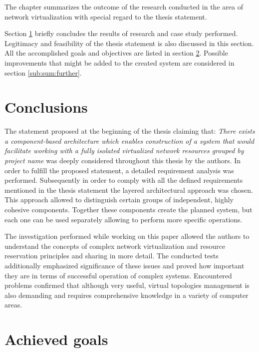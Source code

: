 \documentclass[11pt,openany]{book}
\begin{document}
    The chapter summarizes the outcome of the research conducted in the area of network virtualization with special
    regard to the thesis statement.
	
    Section \ref{sub:sum:concl} briefly concludes the results of research and case study performed. Legitimacy and
    feasibility of the thesis statement is also discussed in this section. All the accomplished goals and objectives are
    listed in section \ref{sub:sum:achieved}. Possible improvements that might be added to the created system are
    considered in section \ref{sub:sum:further}.


    \section{Conclusions}
    \label{sub:sum:concl}

      The statement proposed at the beginning of the thesis claiming that: \emph{There exists a component-based
      architecture which enables construction of a system that would facilitate working with a fully isolated
      virtualized network resources grouped by project name} was deeply considered throughout this thesis by the
      authors. In order to fulfill the proposed statement, a detailed requirement analysis was performed. Subsequently
      in order to comply with all the defined requirements mentioned in the thesis statement the layered architectural
      approach was chosen. This approach allowed to distinguish certain groups of independent, highly cohesive
      components. Together these components create the planned system, but each one can be used separately allowing to
      perform more specific operations.

      The investigation performed while working on this paper allowed the authors to understand the concepts of complex
      network virtualization and resource reservation principles and sharing in more detail. The conducted tests
      additionally emphasized significance of these issues and proved how important they are in terms of successful
      operation of complex systems. Encountered problems confirmed that although very useful, virtual topologies
      management is also demanding and requires comprehensive knowledge in a variety of computer areas.


    \section{Achieved goals}
    \label{sub:sum:achieved}
\end{document}
